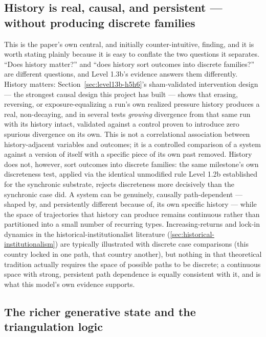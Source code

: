 \subsection{History is real, causal, and persistent --- without producing discrete families}
\label{sec:disc-history-real}

This is the paper's own central, and initially counter-intuitive,
finding, and it is worth stating plainly because it is easy to conflate
the two questions it separates. ``Does history matter?'' and ``does
history sort outcomes into discrete families?'' are different questions,
and Level 1.3b's evidence answers them differently. History matters:
Section~\ref{sec:level13b-h5h6}'s sham-validated intervention design ---
the strongest causal design this project has built --- shows that erasing,
reversing, or exposure-equalizing a run's own realized pressure history
produces a real, non-decaying, and in several tests \textit{growing}
divergence from that same run with its history intact, validated against a
control proven to introduce zero spurious divergence on its own. This is
not a correlational association between history-adjacent variables and
outcomes; it is a controlled comparison of a system against a version of
itself with a specific piece of its own past removed. History does not,
however, sort outcomes into discrete families: the same milestone's own
discreteness test, applied via the identical unmodified rule Level 1.2b
established for the synchronic substrate, rejects discreteness more
decisively than the synchronic case did. A system can be genuinely,
causally path-dependent --- shaped by, and persistently different because
of, its own specific history --- while the space of trajectories that
history can produce remains continuous rather than partitioned into a
small number of recurring types. Increasing-returns and lock-in dynamics
in the historical-institutionalist literature
(\cref{sec:historical-institutionalism}) are typically illustrated with
discrete case comparisons (this country locked in one path, that country
another), but nothing in that theoretical tradition actually requires the
space of possible paths to be discrete; a continuous space with strong,
persistent path dependence is equally consistent with it, and is what this
model's own evidence supports.

\subsection{The richer generative state and the triangulation logic}
\label{sec:disc-triangulation}
\label{sec:disc-richer-state}

